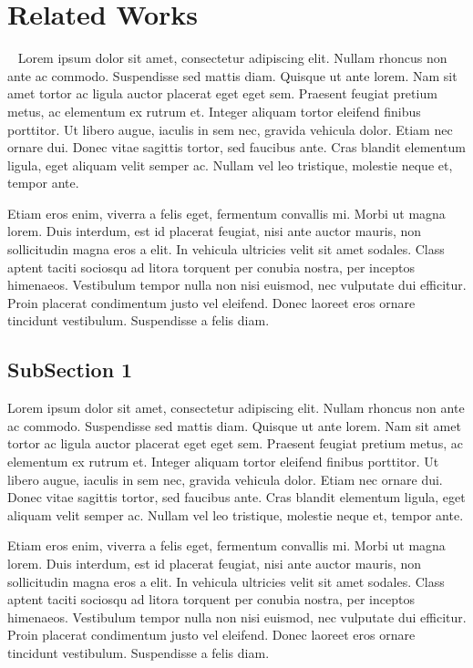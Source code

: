 \documentclass[letterpaper]{article}
\begin{document}
\section{Related Works}~\label{previous}
Lorem ipsum dolor sit amet, consectetur adipiscing elit. Nullam rhoncus non ante ac commodo. Suspendisse sed mattis diam. Quisque ut ante lorem. Nam sit amet tortor ac ligula auctor placerat eget eget sem. Praesent feugiat pretium metus, ac elementum ex rutrum et. Integer aliquam tortor eleifend finibus porttitor. Ut libero augue, iaculis in sem nec, gravida vehicula dolor. Etiam nec ornare dui. Donec vitae sagittis tortor, sed faucibus ante. Cras blandit elementum ligula, eget aliquam velit semper ac. Nullam vel leo tristique, molestie neque et, tempor ante.

Etiam eros enim, viverra a felis eget, fermentum convallis mi. Morbi ut magna lorem. Duis interdum, est id placerat feugiat, nisi ante auctor mauris, non sollicitudin magna eros a elit. In vehicula ultricies velit sit amet sodales. Class aptent taciti sociosqu ad litora torquent per conubia nostra, per inceptos himenaeos. Vestibulum tempor nulla non nisi euismod, nec vulputate dui efficitur. Proin placerat condimentum justo vel eleifend. Donec laoreet eros ornare tincidunt vestibulum. Suspendisse a felis diam.\cite{jacob2015VAI}





\subsection{SubSection 1}
Lorem ipsum dolor sit amet, consectetur adipiscing elit. Nullam rhoncus non ante ac commodo. Suspendisse sed mattis diam. Quisque ut ante lorem. Nam sit amet tortor ac ligula auctor placerat eget eget sem. Praesent feugiat pretium metus, ac elementum ex rutrum et. Integer aliquam tortor eleifend finibus porttitor. Ut libero augue, iaculis in sem nec, gravida vehicula dolor. Etiam nec ornare dui. Donec vitae sagittis tortor, sed faucibus ante. Cras blandit elementum ligula, eget aliquam velit semper ac. Nullam vel leo tristique, molestie neque et, tempor ante.

Etiam eros enim, viverra a felis eget, fermentum convallis mi. Morbi ut magna lorem. Duis interdum, est id placerat feugiat, nisi ante auctor mauris, non sollicitudin magna eros a elit. In vehicula ultricies velit sit amet sodales. Class aptent taciti sociosqu ad litora torquent per conubia nostra, per inceptos himenaeos. Vestibulum tempor nulla non nisi euismod, nec vulputate dui efficitur. Proin placerat condimentum justo vel eleifend. Donec laoreet eros ornare tincidunt vestibulum. Suspendisse a felis diam.
\end{document}
